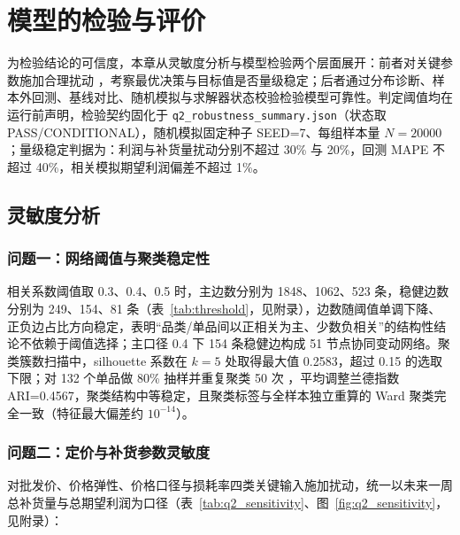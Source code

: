 \section{模型的检验与评价}

为检验结论的可信度，本章从灵敏度分析与模型检验两个层面展开：前者对关键参数施加合理扰动 \cite{saltelli2008}，考察最优决策与目标值是否量级稳定；后者通过分布诊断、样本外回测、基线对比、随机模拟与求解器状态校验检验模型可靠性。判定阈值均在运行前声明，检验契约固化于 \texttt{q2\_robustness\_summary.json}（状态取 PASS/CONDITIONAL），随机模拟固定种子 SEED=7、每组样本量 $N=20000$；量级稳定判据为：利润与补货量扰动分别不超过 30\% 与 20\%，回测 MAPE 不超过 40\%，相关模拟期望利润偏差不超过 1\%。

\subsection{灵敏度分析}
\label{sensitivity_analysis}

\subsubsection{问题一：网络阈值与聚类稳定性}

相关系数阈值取 0.3、0.4、0.5 时，主边数分别为 1848、1062、523 条，稳健边数分别为 249、154、81 条（表~\ref{tab:threshold}，见附录），边数随阈值单调下降、正负边占比方向稳定，表明“品类/单品间以正相关为主、少数负相关”的结构性结论不依赖于阈值选择；主口径 0.4 下 154 条稳健边构成 51 节点协同变动网络。聚类簇数扫描中，silhouette 系数在 $k=5$ 处取得最大值 0.2583，超过 0.15 的选取下限；对 132 个单品做 80\% 抽样并重复聚类 50 次 \cite{efron1993}，平均调整兰德指数 ARI=0.4567，聚类结构中等稳定，且聚类标签与全样本独立重算的 Ward 聚类完全一致（特征最大偏差约 $10^{-14}$）。

\subsubsection{问题二：定价与补货参数灵敏度}

对批发价、价格弹性、价格口径与损耗率四类关键输入施加扰动，统一以未来一周总补货量与总期望利润为口径（表~\ref{tab:q2_sensitivity}、图~\ref{fig:q2_sensitivity}，见附录）：

